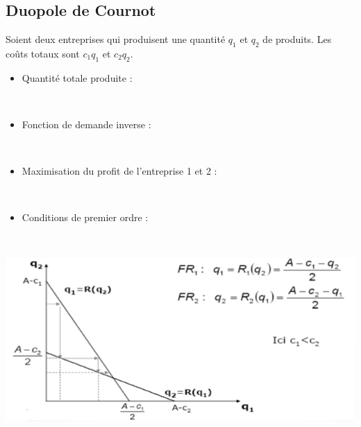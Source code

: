 \subsection{Duopole de Cournot}
Soient deux entreprises qui produisent une quantité $q_{1}$ et $q_{2}$ de produits. Les coûts totaux sont $c_{1}q_{1}$ et $c_{2}q_{2}$. \newline
\begin{itemize}
    \item Quantité totale produite : \newline
    \textcolor{White}{.}
        \begin{center}
            \Large{}
        \end{center}
    \textcolor{White}{.}
    \item Fonction de demande inverse : \newline
    \textcolor{White}{.}
    \begin{center}
        \Large{}
    \end{center}
    \textcolor{White}{.}
    \item Maximisation du profit de l'entreprise 1 et 2 : \newline
    \textcolor{White}{.}
        \begin{center}
            \begin{itemize}
                \Large{} \newline
                \Large{}
            \end{itemize}
        \end{center}
    \textcolor{White}{.}
    \item Conditions de premier ordre : \newline
    \textcolor{White}{.}
    \begin{center}
            \begin{itemize}
                \Large{}
                \Large{}
            \end{itemize}
    \end{center}
    \textcolor{White}{.}
\end{itemize}
\includegraphics[scale=0.8]{Pics/Duopole_cournot.png}
\newpage
